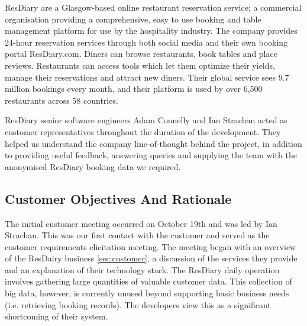 \documentclass{l3proj}
\begin{document}

ResDiary are a Glasgow-based online restaurant reservation service; a commercial organisation providing a comprehensive, easy to use booking and table management platform for use by the hospitality industry. The company provides 24-hour reservation services through both social media and their own booking portal ResDiary.com. Diners can browse restaurants, book tables and place reviews. Restaurants can access tools which let them optimize their yields, manage their reservations and attract new diners. Their global service sees 9.7 million bookings every month, and their platform is used by over 6,500 restaurants across 58 countries. 

ResDiary senior software engineers Adam Connelly and Ian Strachan acted as customer representatives throughout the duration of the development. They helped us understand the company line-of-thought behind the project, in addition to providing useful feedback, answering queries and supplying the team with the anonymised ResDiary booking data we required.


\subsection{Customer Objectives And Rationale}
\label{sec:custobjectives}



The initial customer meeting occurred on October 19th and was led by Ian Strachan. This was our first contact with the customer and served as the customer requirements elicitation meeting. The meeting began with an overview of the ResDairy business \ref{sec:customer}, a discussion of the services they provide and an explanation of their technology stack. The ResDiary daily operation involves gathering large quantities of valuable customer data. This collection of big data, however, is currently unused beyond supporting basic business needs (i.e. retrieving booking records). The developers view this as a significant shortcoming of their system.
\end{document}
